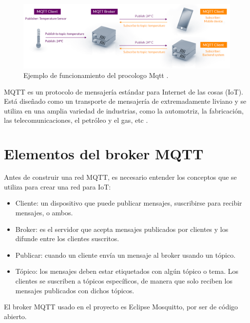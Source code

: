 \begin{itemize}
\vspace{0.5cm}

\begin{figure}[htbp]
	\centering
	\includegraphics[width=.9\textwidth]{./Figures/mqtt.png}
	\caption{Ejemplo de funcionamiento del procologo Mqtt \protect\footnotemark.}
	\label{fig:mqtt}
\end{figure}



MQTT es un protocolo de mensajería estándar para Internet de las cosas (IoT). Está diseñado como un transporte de mensajería de extremadamente liviano y se utiliza en una amplia variedad de industrias, como la automotriz, la fabricación, las telecomunicaciones, el petróleo y el gas, etc \citep{WEBSITE:4}. 
\end{itemize}

\section{Elementos del broker MQTT}

Antes de construir una red MQTT, es necesario entender los conceptos que se utiliza para crear una red para IoT: 
\begin{itemize}
\item Cliente: un dispositivo que puede publicar mensajes, suscribirse para recibir mensajes, o ambos.
\item Broker: es el servidor que acepta mensajes publicados por clientes y los difunde entre los clientes suscritos.
\item Publicar: cuando un cliente envía un mensaje al broker usando un tópico.
\item Tópico: los mensajes deben estar etiquetados con algún tópico o tema. Los clientes se suscriben a tópicos específicos, de manera que solo reciben los mensajes publicados con dichos tópicos. 
\end{itemize}

El broker MQTT usado en el proyecto es Eclipse Mosquitto, por ser de código abierto.

